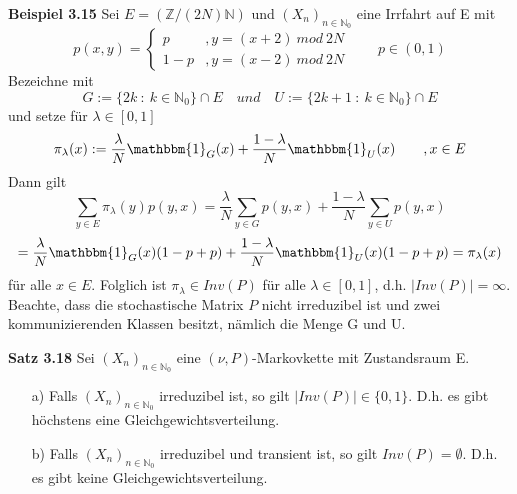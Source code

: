 \clearpairofpagestyles
\ihead{\headmark}
\ohead{\pagemark}
\pagestyle{scrheadings}
\textbf{Beispiel 3.15}
Sei $E= (\mathbb{Z} / (2N)\mathbb{N})$ und $(X_{n})_{n \in \mathbb{N}_{0}}$ eine Irrfahrt auf E mit
\begin{equation*}
p(x,y)=
\begin{cases}
p & , y = (x+2) \: mod \: 2N  \\
1-p & , y = (x-2) \: mod \: 2N 
\end{cases} 
\qquad p \in (0,1)
\end{equation*}
Bezeichne mit
\begin{equation*}
G := \lbrace 2k \: : \: k \in \mathbb{N}_{0} \rbrace \cap E \quad und \quad U := \lbrace 2k +1 \: : \: k \in \mathbb{N}_{0} \rbrace \cap E
\end{equation*}
und setze für $\lambda \in [0,1]$
\begin{equation*}
\pi_{\lambda}(x) := \dfrac{\lambda}{N}\mathbbm{1}_{G}(x) + \dfrac{1-\lambda}{N}\mathbbm{1}_{U}(x) \qquad, x \in E
\end{equation*}
Dann gilt
\begin{equation*}
\sum_{y \in E} \pi_{\lambda}(y)p(y,x) = \dfrac{\lambda}{N} \sum_{y \in G} p(y,x) + \dfrac{1-\lambda}{N} \sum_{y \in U} p(y,x)
\end{equation*}
\begin{equation*}
= \dfrac{\lambda}{N}\mathbbm{1}_{G}(x)(1-p+p) + \dfrac{1-\lambda}{N}\mathbbm{1}_{U}(x)(1-p+p) = \pi_{\lambda}(x)
\end{equation*}
für alle $x \in E$. Folglich ist $\pi_{\lambda} \in Inv(P)$ für alle $\lambda \in [0,1]$, d.h. $\vert Inv(P) \vert = \infty$. Beachte, dass die stochastische Matrix $P$ nicht irreduzibel ist und zwei kommunizierenden Klassen besitzt, nämlich die Menge G und U.

\textbf{Satz 3.18}
\label{höchstens eine Gleichverteilung}
Sei $(X_{n})_{n \in \mathbb{N}_{0}}$ eine $(\nu,P)$-Markovkette mit Zustandsraum E.
\begin{itemize}
\item[a)] Falls $(X_{n})_{n \in \mathbb{N}_{0}}$  irreduzibel ist, so gilt $\vert Inv(P) \vert \in \lbrace 0,1 \rbrace$. D.h. es gibt höchstens eine Gleichgewichtsverteilung.
\item[b)] Falls $(X_{n})_{n \in \mathbb{N}_{0}}$ irreduzibel und transient ist, so gilt $Inv(P) = \emptyset$. D.h. es gibt keine Gleichgewichtsverteilung.  
\end{itemize}


